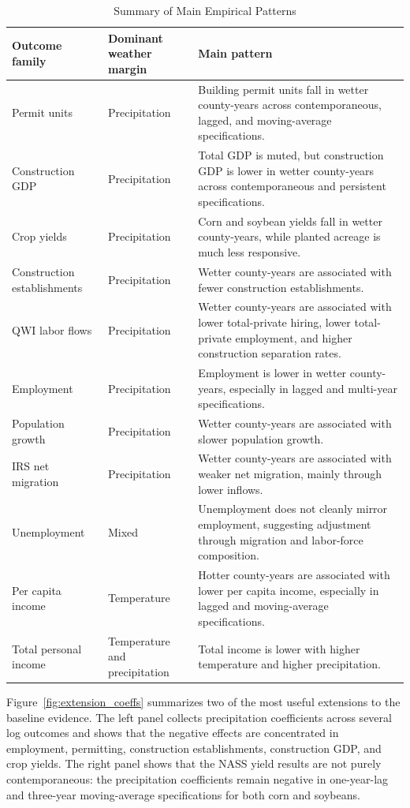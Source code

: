 \documentclass[12pt]{article}
\begin{document}
\begin{table}[htbp]
\centering
\caption{Summary of Main Empirical Patterns}
\label{tab:summary_patterns}
{\small
\setlength{\tabcolsep}{4pt}
\begin{tabular}{@{}L{1.55in}L{1.35in}L{2.65in}@{}}
\toprule
Outcome family & Dominant weather margin & Main pattern \\
\midrule
Permit units & Precipitation & Building permit units fall in wetter county-years across contemporaneous, lagged, and moving-average specifications. \\
Construction GDP & Precipitation & Total GDP is muted, but construction GDP is lower in wetter county-years across contemporaneous and persistent specifications. \\
Crop yields & Precipitation & Corn and soybean yields fall in wetter county-years, while planted acreage is much less responsive. \\
Construction establishments & Precipitation & Wetter county-years are associated with fewer construction establishments. \\
QWI labor flows & Precipitation & Wetter county-years are associated with lower total-private hiring, lower total-private employment, and higher construction separation rates. \\
Employment & Precipitation & Employment is lower in wetter county-years, especially in lagged and multi-year specifications. \\
Population growth & Precipitation & Wetter county-years are associated with slower population growth. \\
IRS net migration & Precipitation & Wetter county-years are associated with weaker net migration, mainly through lower inflows. \\
Unemployment & Mixed & Unemployment does not cleanly mirror employment, suggesting adjustment through migration and labor-force composition. \\
Per capita income & Temperature & Hotter county-years are associated with lower per capita income, especially in lagged and moving-average specifications. \\
Total personal income & Temperature and precipitation & Total income is lower with higher temperature and higher precipitation. \\
\bottomrule
\end{tabular}
}
\end{table}

Figure~\ref{fig:extension_coeffs} summarizes two of the most useful extensions to the baseline evidence. The left panel collects precipitation coefficients across several log outcomes and shows that the negative effects are concentrated in employment, permitting, construction establishments, construction GDP, and crop yields. The right panel shows that the NASS yield results are not purely contemporaneous: the precipitation coefficients remain negative in one-year-lag and three-year moving-average specifications for both corn and soybeans.
\end{document}
